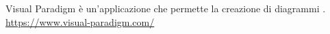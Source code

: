 Visual Paradigm è un’applicazione che permette la creazione di diagrammi .\\
\url{https://www.visual-paradigm.com/}
\clearpage
